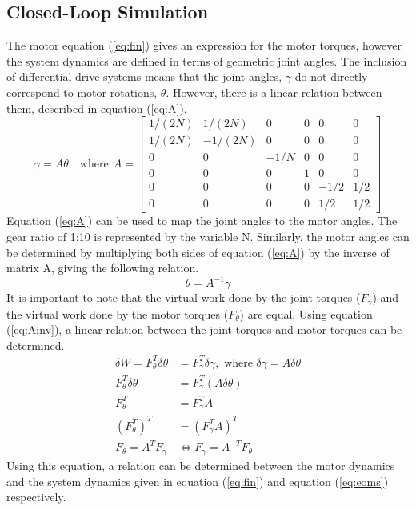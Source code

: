 \newpage
\subsection{Closed-Loop Simulation}
The motor equation (\ref{eq:fin}) gives an expression for the motor torques, however the system dynamics are defined in terms of geometric joint angles. The inclusion of differential drive systems means that the joint angles, $\gamma$ do not directly correspond to motor rotations, $\theta$. However, there is a linear relation between them, described in equation (\ref{eq:A}).
\begin{equation}
  \gamma = A\theta\quad \text{where}~~A=\left[\begin{array}{cccccc}{1 /(2 N)} & {1 /(2 N)} & {0} & {0} & {0} & {0} \\ {1 /(2 N)} & {-1 /(2 N)} & {0} & {0} & {0} & {0} \\ {0} & {0} & {-1 / N} & {0} & {0} & {0} \\ {0} & {0} & {0} & {1} & {0} & {0} \\ {0} & {0} & {0} & {0} & {-1 / 2} & {1 / 2} \\ {0} & {0} & {0} & {0} & {1 / 2} & {1 / 2}\end{array}\right]
\label{eq:A}
\end{equation}
Equation (\ref{eq:A}) can be used to map the joint angles to the motor angles. The gear ratio of 1:10 is represented by the variable N. Similarly, the motor angles can be determined by multiplying both sides of equation (\ref{eq:A}) by the inverse of matrix A, giving the following relation.
\begin{equation}
\theta=A^{-1} \gamma
\label{eq:Ainv}
\end{equation}
It is important to note that the virtual work done by the joint torques ($F_{\gamma}$) and the virtual work done by the motor torques ($F_{\theta}$) are equal. Using equation (\ref{eq:Ainv}), a linear relation between the joint torques and motor torques can be determined.
\[
\begin{aligned}
  \delta W = F_{\theta}^{T} \delta \theta&=F_{\gamma}^{T} \delta \gamma, \text { where } \delta \gamma=A \delta \theta \\
  F_{\theta}^{T} \delta \theta &= F_{\gamma}^{T}(A \delta \theta) \\
  F_{\theta}^{T}&=F_{\gamma}^{T} A\\
  \left(F_{\theta}^{T}\right)^{T}&=\left(F_{\gamma}^{T} A\right)^{T}\\
  F_{\theta}=A^{T} F_{\gamma} &\Leftrightarrow F_{\gamma}=A^{-T} F_{\theta}\qquad\quad
\end{aligned}
\]
Using this equation, a relation can be determined between the motor dynamics and the system dynamics given in equation (\ref{eq:fin}) and equation (\ref{eq:eoms}) respectively.


